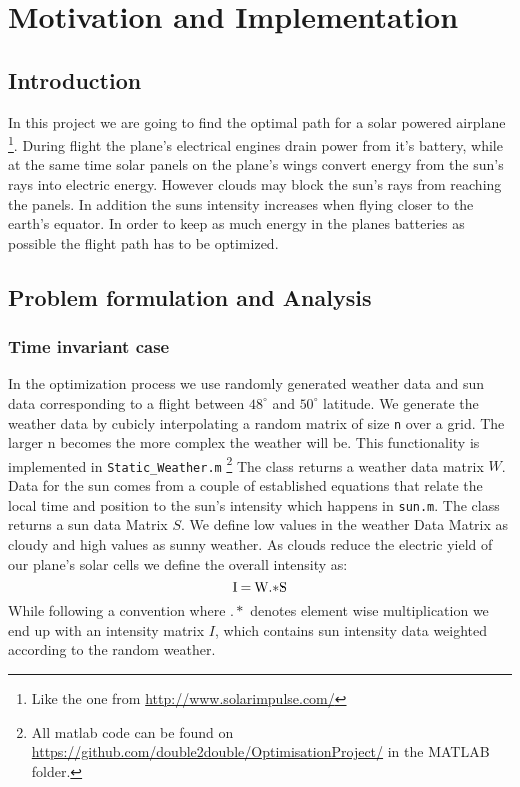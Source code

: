 \documentclass[ twoside,openright,titlepage,numbers=noenddot,headinclude,%
                footinclude=true,cleardoublepage=empty,abstractoff, %
                BCOR=5mm,paper=a4,fontsize=11pt,%
                ngerman,american,%
                ]{scrreprt}
\begin{document}
\frenchspacing
\raggedbottom
{} %
\pagestyle{plain}

%
\pagestyle{scrheadings}



\chapter{Motivation and Implementation}
\section{Introduction}
In this project we are going to find the optimal path for a solar powered airplane \footnote{Like the one from \url{http://www.solarimpulse.com/}}. During flight the plane's electrical engines drain power from it's battery, while at the same time solar panels on the plane's wings convert energy from the sun's rays into electric energy. However clouds may block the sun's rays from reaching the panels. In addition the suns intensity increases when flying closer to the earth's equator. In order to keep as much energy in the planes batteries as possible the flight path has to be optimized.

\section{Problem formulation and Analysis}
\subsection{Time invariant case}
In the optimization process we use randomly generated weather data and sun data corresponding to a flight between $48^\circ$ and $50^\circ$ latitude. We generate the weather data by cubicly interpolating a random matrix of size \texttt{n} over a grid. The larger n becomes the more complex the weather will be. This functionality is implemented in \texttt{Static\_Weather.m} \footnote{All matlab code can be found on \url{https://github.com/double2double/OptimisationProject/} in the MATLAB folder.} The class returns a weather data matrix $W$.
Data for the sun comes from a couple of established equations that relate the local time and position to the sun's intensity  which happens in \texttt{sun.m}. The class returns a sun data Matrix $S$. We define low values in the weather Data Matrix as cloudy and high values as sunny weather. As clouds reduce the electric yield of our plane's solar cells we define the overall intensity as:
\begin{equation}
$I$ \:= \: $W$ .* $S$
\end{equation}
While following a convention where $.*$ denotes element wise multiplication we end up with an intensity matrix $I$, which contains sun intensity data weighted according to the random weather.
\end{document}
